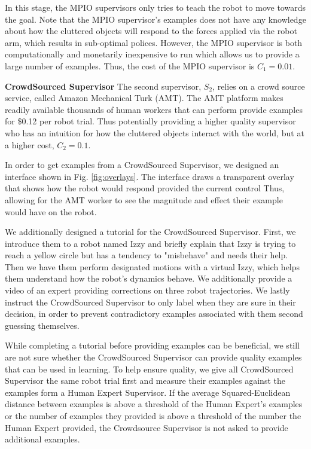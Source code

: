 \documentclass[10pt, conference]{ieeeconf}      %
\begin{document}
In this stage, the MPIO supervisors only tries to teach the robot to move towards the goal. Note that the MPIO supervisor's examples does not have any knowledge about how the cluttered objects will respond to the forces applied via the robot arm, which results in sub-optimal polices. However, the MPIO supervisor is both computationally and monetarily inexpensive to run which allows us to provide a large number of examples. Thus, the cost of the MPIO supervisor is $C_1 = 0.01$. 


\noindent \textbf{CrowdSourced Supervisor} The second supervisor, $S_2$, relies on a crowd source service, called Amazon Mechanical Turk (AMT). The AMT platform makes readily available thousands of human workers that can perform  provide examples for  \$0.12 per robot trial. Thus potentially providing a higher quality supervisor who has an intuition for how the cluttered objects interact with the world, but at a  higher cost, $C_2 = 0.1$.

In order to get examples from a CrowdSourced Supervisor, we designed an interface shown in Fig. \ref{fig:overlays}. The interface draws a transparent overlay that shows how the robot would respond provided the current control Thus, allowing for the AMT worker to see the magnitude and effect their example would have on the robot.

We additionally designed a tutorial for the CrowdSourced Supervisor. First, we introduce them to a robot named Izzy and briefly explain that Izzy is trying to reach a yellow circle but has a tendency to "misbehave" and needs their help. Then we have them perform designated motions with a virtual Izzy, which helps them understand how the robot's dynamics behave. We additionally provide a video of an expert providing corrections on three robot trajectories. We lastly instruct the CrowdSourced Supervisor to only label when they are sure in their decision, in order to prevent contradictory examples associated with them second guessing themselves.  

While completing a tutorial before providing examples can be beneficial, we still are not sure whether the CrowdSourced Supervisor can provide quality examples that can be used in learning. To help ensure quality, we give all CrowdSourced Supervisor  the same robot trial first and measure their examples against the examples form a  Human Expert Supervisor. If the average Squared-Euclidean distance between examples is above a threshold of the Human Expert's examples or the number of examples they provided is above a threshold of the number the Human Expert provided, the Crowdsource Supervisor is not asked to provide additional examples.
\end{document}
